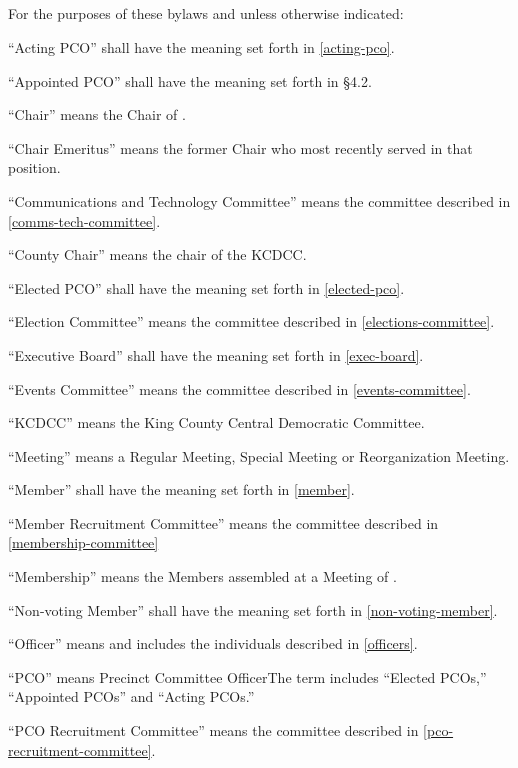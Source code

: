\subsection{}
For the purposes of these bylaws and unless otherwise indicated:
\begin{alphalist}
    \item “Acting PCO” shall have the meaning set forth in \autoref{acting-pco}.
    \item “Appointed PCO” shall have the meaning set forth in \S 4.2.
    \item “Chair” means the Chair of \thedistrict{}.
    \item “Chair Emeritus” means the former Chair who most recently served in that position.
    \item “Communications and Technology Committee” means the committee described in \autoref{comms-tech-committee}.
    \item “County Chair” means the chair of the KCDCC.
    \item “Elected PCO” shall have the meaning set forth in \autoref{elected-pco}.
    \item “Election Committee” means the committee described in \autoref{elections-committee}.
    \item “Executive Board” shall have the meaning set forth in \autoref{exec-board}.
    \item “Events Committee” means the committee described in \autoref{events-committee}.
    \item “KCDCC” means the King County Central Democratic Committee.
    \item “Meeting” means a Regular Meeting, Special Meeting or Reorganization Meeting.
    \item “Member” shall have the meaning set forth in \autoref{member}.
    \item “Member Recruitment Committee” means the committee described in \autoref{membership-committee}
    \item “Membership” means the Members assembled at a Meeting of \thedistrict{}.
    \item “Non-voting Member” shall have the meaning set forth in \autoref{non-voting-member}.
    \item “Officer” means and includes the individuals described in \autoref{officers}.
    \item “PCO” means Precinct Committee OfficerThe term includes “Elected PCOs,” “Appointed PCOs” and “Acting PCOs.”
    \item “PCO Recruitment Committee” means the committee described in \autoref{pco-recruitment-committee}.

\end{alphalist}
